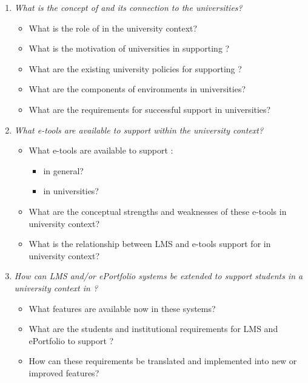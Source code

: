\begin{enumerate}
  \item \textit{What is the concept of \LLLs and its connection to the
  universities?}
	\begin{itemize}
	  \item What is the role of \LLLs in the university context?
	  \item What is the motivation of universities in supporting \LLLsn?
  	  \item What are the existing university policies for supporting \LLLsn?
      \item What are the components of \LLLs environments in universities?
      \item What are the requirements for successful \LLLs support in
   universities?
	\end{itemize} 
	
   \item \textit{What e-tools are available to support \LLLs within the
   university context?}
	\begin{itemize}
		\item What e-tools are available to support \LLLsn:
			\begin{itemize}
				\item in general?
				\item in universities?
			\end{itemize}
		\item What are the conceptual strengths and weaknesses of these e-tools in
university context?
		\item What is the relationship between LMS and e-tools support for \LLLs in
university context?
	\end{itemize}

	\item \textit{How can LMS and/or ePortfolio systems be extended to support
	students in a university context in \LLLsn?}
	\begin{itemize}
		\item What features are available now in these systems?
		\item What are the students and institutional requirements for LMS and
		ePortfolio to support \LLLsn?
		\item How can these requirements be translated and implemented into new or
		improved features?
	\end{itemize}


\end{enumerate}
